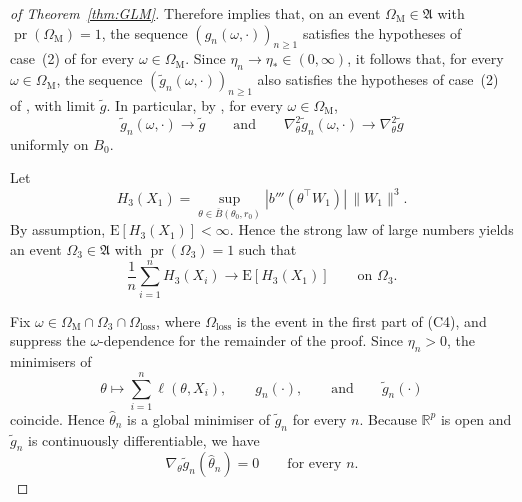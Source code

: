 \documentclass[11pt]{article}
\renewcommand{\Pr}{\operatorname{pr}}
\theoremstyle{plain}
\theoremstyle{definition}
\theoremstyle{remark}
\begin{document}
\begin{proof}[of Theorem~\ref{thm:GLM}]
Therefore \citet[Thm.~13]{miller2021generalized_posteriors} implies
that, on an event $\Omega_{\mathrm{M}}\in\mathfrak{A}$ with $\Pr(\Omega_{\mathrm{M}})=1$,
the sequence $(g_{n}(\omega,\cdot))_{n\ge1}$ satisfies the hypotheses
of case~(2) of \citet[Thm.~5]{miller2021generalized_posteriors}
for every $\omega\in\Omega_{\mathrm{M}}$. Since $\eta_{n}\to\eta_{*}\in(0,\infty)$,
it follows that, for every $\omega\in\Omega_{\mathrm{M}}$, the sequence
$(\tilde{g}_{n}(\omega,\cdot))_{n\ge1}$ also satisfies the hypotheses
of case~(2) of \citet[Thm.~5]{miller2021generalized_posteriors},
with limit $\tilde{g}$. In particular, by \citet[Thm.~7]{miller2021generalized_posteriors},
for every $\omega\in\Omega_{\mathrm{M}}$,
\[
\tilde{g}_{n}(\omega,\cdot)\to\tilde{g}\qquad\text{and}\qquad\nabla_{\theta}^{2}\tilde{g}_{n}(\omega,\cdot)\to\nabla_{\theta}^{2}\tilde{g}
\]
uniformly on $B_0$.

Let
\[
H_{3}(X_{1})=\sup_{\theta\in\overline{B}(\theta_{0},r_{0})}|b'''(\theta^{\top}W_{1})|\,\|W_{1}\|^{3}.
\]
By assumption, $\mathrm{E}[H_{3}(X_{1})]<\infty$. Hence the strong
law of large numbers yields an event $\Omega_{3}\in\mathfrak{A}$
with $\Pr(\Omega_{3})=1$ such that
\[
\frac{1}{n}\sum_{i=1}^{n}H_{3}(X_{i})\to\mathrm{E}[H_{3}(X_{1})]\qquad\text{on }\Omega_{3}.
\]

Fix $\omega\in\Omega_{\mathrm{M}}\cap\Omega_{3}\cap\Omega_{\mathrm{loss}}$,
where $\Omega_{\mathrm{loss}}$ is the event in the first part of
{(C4)}, and suppress the $\omega$-dependence for the remainder
of the proof. Since $\eta_{n}>0$, the minimisers of
\[
\theta\mapsto\sum_{i=1}^{n}\ell(\theta,X_{i}),\qquad g_{n}(\cdot),\qquad\text{and}\qquad\tilde{g}_{n}(\cdot)
\]
coincide. Hence $\hat{\theta}_{n}$ is a global minimiser of $\tilde{g}_{n}$
for every $n$. Because $\mathbb{R}^{p}$ is open and $\tilde{g}_{n}$
is continuously differentiable, we have
\[
\nabla_{\theta}\tilde{g}_{n}(\hat{\theta}_{n})=0\qquad\text{for every }n.
\]


\end{proof}
\end{document}
